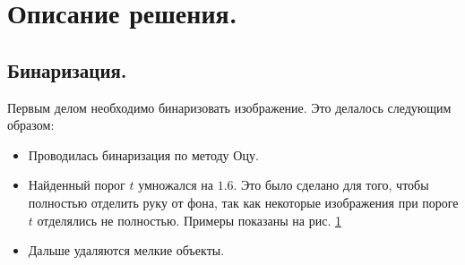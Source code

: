 \documentclass[12pt,fleqn]{article}
\begin{document}
\newpage
\section{Описание решения.}
\subsection{Бинаризация.}
Первым делом необходимо бинаризовать изображение. Это делалось следующим образом:
\begin{itemize}
\item Проводилась бинаризация по методу Оцу.
\item Найденный порог $t$ умножался на $1.6$. Это было сделано для того, чтобы полностью отделить руку от фона, так как некоторые изображения при пороге $t$ отделялись не полностью. Примеры показаны на рис. \hyperref[Image1]{1}
\item Дальше удаляются мелкие объекты.
\end{itemize}
\end{document}
